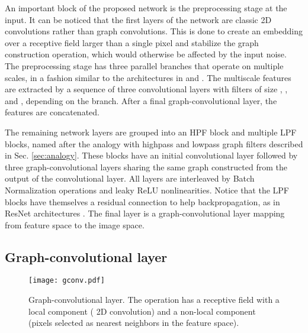 \documentclass[journal]{IEEEtran}
\begin{document}
An important block of the proposed network is the preprocessing stage at the input. It can be noticed that the first layers of the network are classic 2D convolutions rather than graph convolutions. This is done to create an embedding over a receptive field larger than a single pixel and stabilize the graph construction operation, which would otherwise be affected by the input noise. The preprocessing stage has three parallel branches that operate on multiple scales, in a fashion similar to the architectures in \cite{szegedy2015going} and \cite{divakar2017image}. The multiscale features are extracted by a sequence of three convolutional layers with filters of size , , and , depending on the branch. After a final graph-convolutional layer, the features are concatenated. 

The remaining network layers are grouped into an HPF block and multiple LPF blocks, named after the analogy with highpass and lowpass graph filters described in Sec. \ref{sec:analogy}. These blocks have an initial  convolutional layer followed by three graph-convolutional layers sharing the same graph constructed from the output of the convolutional layer. All layers are interleaved by Batch Normalization operations \cite{ioffe2015batchnorm} and leaky ReLU nonlinearities. Notice that the LPF blocks have themselves a residual connection to help backpropagation, as in ResNet architectures \cite{he2016deep}. The final layer is a graph-convolutional layer mapping from feature space to the image space.




\subsection{Graph-convolutional layer} \label{sec:gconv_layer}
\label{sec:graph_conv}
\begin{figure}
    \centering
    \texttt{[image: gconv.pdf]}
    \caption{Graph-convolutional layer. The operation has a receptive field with a local component ( 2D convolution) and a non-local component (pixels selected as nearest neighbors in the feature space).}
    \label{fig:gconv}
\end{figure}
\end{document}
